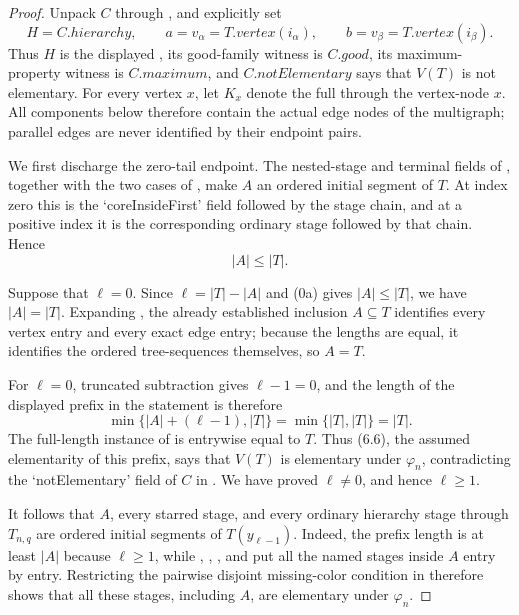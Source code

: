\begin{proof}
Unpack $C$ through , and explicitly set
\[
 H=C.\mathit{hierarchy},\qquad
 a=v_\alpha=T.\mathit{vertex}(i_\alpha),\qquad
 b=v_\beta=T.\mathit{vertex}(i_\beta).
\]
Thus $H$ is the displayed , its good-family
witness is $C.\mathit{good}$, its maximum-property witness is
$C.\mathit{maximum}$, and $C.\mathit{notElementary}$ says that $V(T)$ is
not elementary.  For every vertex $x$, let $K_x$ denote the full
 through the vertex-node $x$.  All components
below therefore contain the actual edge nodes of the multigraph; parallel
edges are never identified by their endpoint pairs.

We first discharge the zero-tail endpoint.  The nested-stage and terminal fields of
, together with the two cases of
, make $A$ an ordered initial segment of
$T$.  At index zero this is the `coreInsideFirst' field followed by the
stage chain, and at a positive index it is the corresponding ordinary
stage followed by that chain.  Hence
\[
                         |A|\leq |T|.                         \tag{0a}
\]

Suppose that $\ell=0$.  Since $\ell=|T|-|A|$ and (0a) gives
$|A|\leq |T|$, we have $|A|=|T|$.  Expanding
, the already established inclusion
$A\subseteq T$ identifies every vertex entry and every exact edge entry;
because the lengths are equal, it identifies the ordered tree-sequences
themselves, so $A=T$.

For $\ell=0$, truncated subtraction gives $\ell-1=0$, and the length of the
displayed prefix in the statement is therefore
\[
 \min\{|A|+(\ell-1),|T|\}=\min\{|T|,|T|\}=|T|.
\]
The full-length instance of  is entrywise
equal to $T$.  Thus (6.6), the assumed elementarity of this prefix, says
that $V(T)$ is elementary under $\varphi_n$, contradicting the
`notElementary' field of $C$ in
.  We have proved $\ell\ne0$, and hence
$\ell\geq1$.

It follows that $A$, every starred stage, and every ordinary hierarchy
stage through $T_{n,q}$ are ordered initial segments of
$T(y_{\ell-1})$.  Indeed, the prefix length is at least $|A|$ because
$\ell\geq1$, while ,
,
, and
 put all the named stages inside
$A$ entry by entry.  Restricting the pairwise disjoint missing-color
condition in  therefore shows that
all these stages, including $A$, are elementary under $\varphi_n$.     


\end{proof}
